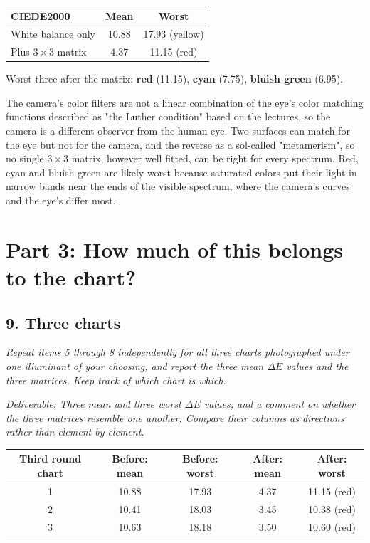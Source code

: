 \documentclass[11pt]{article}
\newcommand{\task}[3]{\subsection*{#1}{\sloppy\noindent\textit{#2}\par}\smallskip\noindent\textit{Deliverable: #3}\par\medskip}
\begin{document}
\begin{center}
\begin{tabular}{lcc}
\toprule
CIEDE2000 & Mean & Worst \\
\midrule
White balance only & 10.88 & 17.93 (yellow) \\
Plus $3\times3$ matrix & 4.37 & 11.15 (red) \\
\bottomrule
\end{tabular}
\end{center}

\noindent Worst three after the matrix: \textbf{red} (11.15), \textbf{cyan} (7.75), \textbf{bluish green} (6.95).

The camera's color filters are not a linear combination of the eye's color matching functions described as "the Luther condition" based on the lectures, so the camera is a different observer from the human eye. Two surfaces can match for the eye but not for the camera, and the reverse as a sol-called "metamerism", so no single $3\times3$ matrix, however well fitted, can be right for every spectrum. Red, cyan and bluish green are likely worst because saturated colors put their light in narrow bands near the ends of the visible spectrum, where the camera's curves and the eye's differ most.

\section*{Part 3: How much of this belongs to the chart?}

\task{9. Three charts}
{Repeat items 5 through 8 independently for all three charts photographed under one illuminant of your choosing, and report the three mean $\Delta E$ values and the three matrices. Keep track of which chart is which.}
{Three mean and three worst $\Delta E$ values, and a comment on whether the three matrices resemble one another. Compare their columns as directions rather than element by element.}

\begin{center}
\begin{tabular}{ccccc}
\toprule
Third round chart & Before: mean & Before: worst & After: mean & After: worst \\
\midrule
1 & 10.88 & 17.93 & 4.37 & 11.15 (red) \\
2 & 10.41 & 18.03 & 3.45 & 10.38 (red) \\
3 & 10.63 & 18.18 & 3.50 & 10.60 (red) \\
\bottomrule
\end{tabular}
\end{center}
\end{document}
